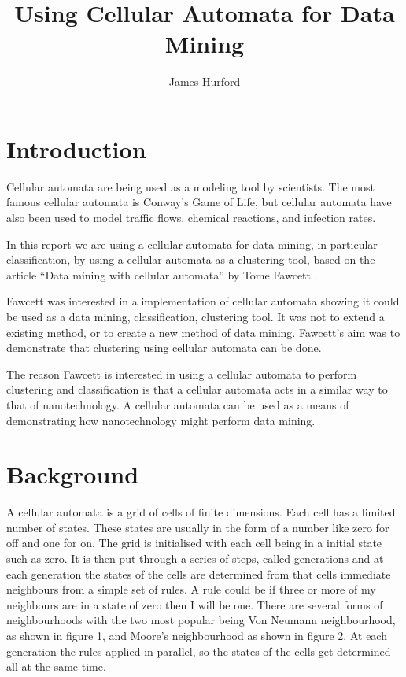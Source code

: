 \documentclass[11pt]{article}
\title{Using Cellular Automata for Data Mining}
\author{James Hurford}
\date{}
\begin{document}
\maketitle

\setcounter{tocdepth}{3}
\tableofcontents
\vspace*{1cm}


\section{Introduction}
\label{sec-1}


  Cellular automata are being used as a modeling tool by
  scientists. The most famous cellular automata is Conway's Game of
  Life, but cellular automata have also been used to model traffic
  flows, chemical reactions, and infection rates.

  In this report we are using a cellular automata for data mining, in
  particular classification, by using a cellular automata as a
  clustering tool, based on the article ``Data mining with cellular
  automata'' by Tome Fawcett \cite{fawcett08}.
 
  Fawcett \cite{fawcett08} was interested in a implementation of
  cellular automata showing it could be used as a data mining,
  classification, clustering tool.  It was not to extend a existing
  method, or to create a new method of data mining. Fawcett's
  \cite{fawcett08} aim was to demonstrate that clustering using
  cellular automata can be done.

  The reason Fawcett \cite{fawcett08} is interested in using a
  cellular automata to perform clustering and classification is that a
  cellular automata acts in a similar way to that of nanotechnology. A
  cellular automata can be used as a means of demonstrating how
  nanotechnology might perform data mining.
\section{Background}
\label{sec-2}

  A cellular automata is a grid of cells of finite dimensions.  Each
  cell has a limited number of states.  These states are usually in
  the form of a number like zero for off and one for on.  The grid is
  initialised with each cell being in a initial state such as zero.
  It is then put through a series of steps, called generations and at
  each generation the states of the cells are determined from that
  cells immediate neighbours from a simple set of rules.  A rule could
  be if three or more of my neighbours are in a state of zero then I
  will be one.  There are several forms of neighbourhoods with the two
  most popular being Von Neumann neighbourhood, as shown in figure 1,
  and Moore's neighbourhood as shown in figure 2. At each generation
  the rules applied in parallel, so the states of the cells get
  determined all at the same time.
\end{document}

